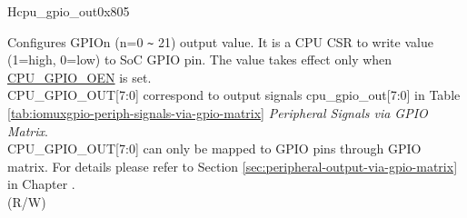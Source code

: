 \begin{register}{H}{cpu\_gpio\_out}{0x805}\label{regdesc:GPIO_OUT}
%
%
%
%
%
%
%
%
%
\regnewline%
\begin{regdesc}\begin{reglist}
\label{fielddesc:GPIO_OUT}\item [CPU\_GPIO\_OUT] Configures GPIOn (n=0 \verb+~+ 21) output value. It is a CPU CSR to write value (1=high, 0=low) to SoC GPIO pin. The value takes effect only when \hyperref[fielddesc:GPIO_OEN]{CPU\_GPIO\_OEN} is set.\\
CPU\_GPIO\_OUT[7:0] correspond to output signals cpu\_gpio\_out[7:0] in Table \ref{tab:iomuxgpio-periph-signals-via-gpio-matrix} \textit{Peripheral Signals via GPIO Matrix}. \\
CPU\_GPIO\_OUT[7:0] can only be mapped to GPIO pins through GPIO matrix. For details please refer to Section \ref{sec:peripheral-output-via-gpio-matrix} in Chapter \textit{}.\\
(R/W)
\end{reglist}\end{regdesc}
\end{register}
